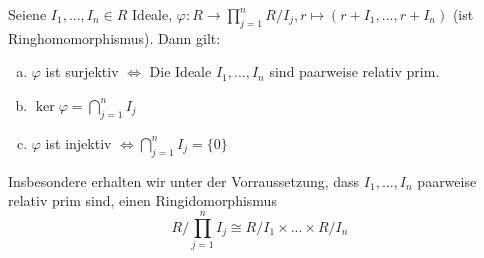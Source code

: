 \documentclass[a4paper, titlepage]{article}
\theoremstyle{definition}
\begin{document}
\begin{satz}
    Seiene $I_1,...,I_n \in R $ Ideale, $\varphi : R \longrightarrow \prod_{j=1}^{n}R/I_{j}, r \mapsto(r+I_1,...,r+I_n)$ (ist Ringhomomorphismus). Dann gilt:
    \begin{enumerate}[(a)]
        \item $\varphi$ ist surjektiv $\Leftrightarrow$ Die Ideale $I_1,...,I_n$ sind paarweise relativ prim.
        \item $\ker\varphi = \bigcap_{j=1}^{n}I_j$
        \item $\varphi$ ist injektiv $\Leftrightarrow \bigcap_{j=1}^{n}I_j=\{0\}$
    \end{enumerate}
    Insbesondere erhalten wir unter der Vorraussetzung, dass $I_1,..., I_n$ paarweise relativ prim sind, einen Ringidomorphismus
    $$R/\prod_{j=1}^{n}I_j\cong R/I_1\times...\times R/I_n$$
\end{satz}
\end{document}
